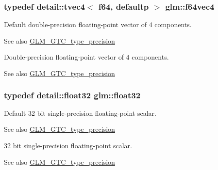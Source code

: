 \subsubsection[{\texorpdfstring{f64vec4}{f64vec4}}]{\setlength{\rightskip}{0pt plus 5cm}typedef detail\+::tvec4$<$ f64, defaultp $>$ {\bf glm\+::f64vec4}}\hypertarget{group__gtc__type__precision_gac10d088c5f1d16a62fb019408af34e1b}{}\label{group__gtc__type__precision_gac10d088c5f1d16a62fb019408af34e1b}
Default double-\/precision floating-\/point vector of 4 components. \begin{DoxySeeAlso}{See also}
\hyperlink{group__gtc__type__precision}{G\+L\+M\+\_\+\+G\+T\+C\+\_\+type\+\_\+precision}
\end{DoxySeeAlso}
Double-\/precision floating-\/point vector of 4 components. \begin{DoxySeeAlso}{See also}
\hyperlink{group__gtc__type__precision}{G\+L\+M\+\_\+\+G\+T\+C\+\_\+type\+\_\+precision} 
\end{DoxySeeAlso}
\subsubsection[{\texorpdfstring{float32}{float32}}]{\setlength{\rightskip}{0pt plus 5cm}typedef detail\+::float32 {\bf glm\+::float32}}\hypertarget{group__gtc__type__precision_ga814f2f65354b6588b067cc5c67a6b340}{}\label{group__gtc__type__precision_ga814f2f65354b6588b067cc5c67a6b340}
Default 32 bit single-\/precision floating-\/point scalar. \begin{DoxySeeAlso}{See also}
\hyperlink{group__gtc__type__precision}{G\+L\+M\+\_\+\+G\+T\+C\+\_\+type\+\_\+precision}
\end{DoxySeeAlso}
32 bit single-\/precision floating-\/point scalar. \begin{DoxySeeAlso}{See also}
\hyperlink{group__gtc__type__precision}{G\+L\+M\+\_\+\+G\+T\+C\+\_\+type\+\_\+precision} 
\end{DoxySeeAlso}
